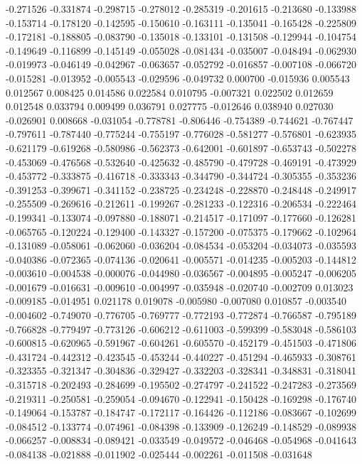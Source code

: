 -0.271526
-0.331874
-0.298715
-0.278012
-0.285319
-0.201615
-0.213680
-0.133988
-0.153714
-0.178120
-0.142595
-0.150610
-0.163111
-0.135041
-0.165428
-0.225809
-0.172181
-0.188805
-0.083790
-0.135018
-0.133101
-0.131508
-0.129944
-0.104754
-0.149649
-0.116899
-0.145149
-0.055028
-0.081434
-0.035007
-0.048494
-0.062930
-0.019973
-0.046149
-0.042967
-0.063657
-0.052792
-0.016857
-0.007108
-0.066720
-0.015281
-0.013952
-0.005543
-0.029596
-0.049732
0.000700
-0.015936
0.005543
0.012567
0.008425
0.014586
0.022584
0.010795
-0.007321
0.022502
0.012659
0.012548
0.033794
0.009499
0.036791
0.027775
-0.012646
0.038940
0.027030
-0.026901
0.008668
-0.031054
-0.778781
-0.806446
-0.754389
-0.744621
-0.767447
-0.797611
-0.787440
-0.775244
-0.755197
-0.776028
-0.581277
-0.576801
-0.623935
-0.621179
-0.619268
-0.580986
-0.562373
-0.642001
-0.601897
-0.653743
-0.502278
-0.453069
-0.476568
-0.532640
-0.425632
-0.485790
-0.479728
-0.469191
-0.473929
-0.453772
-0.333875
-0.416718
-0.333343
-0.344790
-0.344724
-0.305355
-0.353236
-0.391253
-0.399671
-0.341152
-0.238725
-0.234248
-0.228870
-0.248448
-0.249917
-0.255509
-0.269616
-0.212611
-0.199267
-0.281233
-0.122316
-0.206534
-0.222464
-0.199341
-0.133074
-0.097880
-0.188071
-0.214517
-0.171097
-0.177660
-0.126281
-0.065765
-0.120224
-0.129400
-0.143327
-0.157200
-0.075375
-0.179662
-0.102964
-0.131089
-0.058061
-0.062060
-0.036204
-0.084534
-0.053204
-0.034073
-0.035593
-0.040386
-0.072365
-0.074136
-0.020641
-0.005571
-0.014235
-0.005203
-0.144812
-0.003610
-0.004538
-0.000076
-0.044980
-0.036567
-0.004895
-0.005247
-0.006205
-0.001679
-0.016631
-0.009610
-0.004997
-0.035948
-0.020740
-0.002709
0.013023
-0.009185
-0.014951
0.021178
0.019078
-0.005980
-0.007080
0.010857
-0.003540
-0.004602
-0.749070
-0.776705
-0.769777
-0.772193
-0.772874
-0.766587
-0.795189
-0.766828
-0.779497
-0.773126
-0.606212
-0.611003
-0.599399
-0.583048
-0.586103
-0.600815
-0.620965
-0.591967
-0.604261
-0.605570
-0.452179
-0.451503
-0.471806
-0.431724
-0.442312
-0.423545
-0.453244
-0.440227
-0.451294
-0.465933
-0.308761
-0.323355
-0.321347
-0.304836
-0.329427
-0.332203
-0.328341
-0.348831
-0.318041
-0.315718
-0.202493
-0.284699
-0.195502
-0.274797
-0.241522
-0.247283
-0.273569
-0.219311
-0.250581
-0.259054
-0.094670
-0.122941
-0.150428
-0.169298
-0.176740
-0.149064
-0.153787
-0.184747
-0.172117
-0.164426
-0.112186
-0.083667
-0.102699
-0.084512
-0.133774
-0.074961
-0.084398
-0.133909
-0.126249
-0.148529
-0.089938
-0.066257
-0.008834
-0.089421
-0.033549
-0.049572
-0.046468
-0.054968
-0.041643
-0.084138
-0.021888
-0.011902
-0.025444
-0.002261
-0.011508
-0.031648

